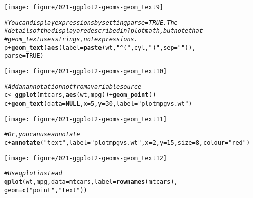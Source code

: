 \documentclass[a4paper,titlepage]{tufte-handout}\usepackage[]{graphicx}\usepackage[]{color}
\makeatletter
\def\maxwidth{ %
  \ifdim\Gin@nat@width>\linewidth
    \linewidth
  \else
    \Gin@nat@width
  \fi
}
\newcommand{\hlnum}[1]{\textcolor[rgb]{0.686,0.059,0.569}{#1}}%
\newcommand{\hlstr}[1]{\textcolor[rgb]{0.192,0.494,0.8}{#1}}%
\newcommand{\hlcom}[1]{\textcolor[rgb]{0.678,0.584,0.686}{\textit{#1}}}%
\newcommand{\hlopt}[1]{\textcolor[rgb]{0,0,0}{#1}}%
\newcommand{\hlstd}[1]{\textcolor[rgb]{0.345,0.345,0.345}{#1}}%
\newcommand{\hlkwa}[1]{\textcolor[rgb]{0.161,0.373,0.58}{\textbf{#1}}}%
\newcommand{\hlkwb}[1]{\textcolor[rgb]{0.69,0.353,0.396}{#1}}%
\newcommand{\hlkwc}[1]{\textcolor[rgb]{0.333,0.667,0.333}{#1}}%
\newcommand{\hlkwd}[1]{\textcolor[rgb]{0.737,0.353,0.396}{\textbf{#1}}}%
\newenvironment{kframe}{%
 \def\at@end@of@kframe{}%
 \ifinner\ifhmode%
  \def\at@end@of@kframe{\end{minipage}}%
  \begin{minipage}{\columnwidth}%
 \fi\fi%
 \def\FrameCommand##1{\hskip\@totalleftmargin \hskip-\fboxsep
 \colorbox{shadecolor}{##1}\hskip-\fboxsep
     \hskip-\linewidth \hskip-\@totalleftmargin \hskip\columnwidth}%
 \MakeFramed {\advance\hsize-\width
   \@totalleftmargin\z@ \linewidth\hsize
   \@setminipage}}%
 {\par\unskip\endMakeFramed%
 \at@end@of@kframe}
\newenvironment{knitrout}{}{} %
\makeatother
\begin{document}
\begin{knitrout}
\begin{kframe}
\begin{alltt}
\end{alltt}
\end{kframe}
\texttt{[image: figure/021-ggplot2-geoms-geom\_text9]} 
\begin{kframe}\begin{alltt}
\hlcom{# You can display expressions by setting parse = TRUE.  The}
\hlcom{# details of the display are described in ?plotmath, but note that}
\hlcom{# geom_text uses strings, not expressions.}
\hlstd{p} \hlopt{+} \hlkwd{geom_text}\hlstd{(}\hlkwd{aes}\hlstd{(}\hlkwc{label} \hlstd{=} \hlkwd{paste}\hlstd{(wt,} \hlstr{"^("}\hlstd{, cyl,} \hlstr{")"}\hlstd{,} \hlkwc{sep} \hlstd{=} \hlstr{""}\hlstd{)),}
  \hlkwc{parse} \hlstd{=} \hlnum{TRUE}\hlstd{)}
\end{alltt}
\end{kframe}
\texttt{[image: figure/021-ggplot2-geoms-geom\_text10]} 
\begin{kframe}\begin{alltt}
\hlcom{# Add an annotation not from a variable source}
\hlstd{c} \hlkwb{<-} \hlkwd{ggplot}\hlstd{(mtcars,} \hlkwd{aes}\hlstd{(wt, mpg))} \hlopt{+} \hlkwd{geom_point}\hlstd{()}
\hlstd{c} \hlopt{+} \hlkwd{geom_text}\hlstd{(}\hlkwc{data} \hlstd{=} \hlkwa{NULL}\hlstd{,} \hlkwc{x} \hlstd{=} \hlnum{5}\hlstd{,} \hlkwc{y} \hlstd{=} \hlnum{30}\hlstd{,} \hlkwc{label} \hlstd{=} \hlstr{"plot mpg vs. wt"}\hlstd{)}
\end{alltt}
\end{kframe}
\texttt{[image: figure/021-ggplot2-geoms-geom\_text11]} 
\begin{kframe}\begin{alltt}
\hlcom{# Or, you can use annotate}
\hlstd{c} \hlopt{+} \hlkwd{annotate}\hlstd{(}\hlstr{"text"}\hlstd{,} \hlkwc{label} \hlstd{=} \hlstr{"plot mpg vs. wt"}\hlstd{,} \hlkwc{x} \hlstd{=} \hlnum{2}\hlstd{,} \hlkwc{y} \hlstd{=} \hlnum{15}\hlstd{,} \hlkwc{size} \hlstd{=} \hlnum{8}\hlstd{,} \hlkwc{colour} \hlstd{=} \hlstr{"red"}\hlstd{)}
\end{alltt}
\end{kframe}
\texttt{[image: figure/021-ggplot2-geoms-geom\_text12]} 
\begin{kframe}\begin{alltt}
\hlcom{# Use qplot instead}
\hlkwd{qplot}\hlstd{(wt, mpg,} \hlkwc{data} \hlstd{= mtcars,} \hlkwc{label} \hlstd{=} \hlkwd{rownames}\hlstd{(mtcars),}
   \hlkwc{geom}\hlstd{=}\hlkwd{c}\hlstd{(}\hlstr{"point"}\hlstd{,} \hlstr{"text"}\hlstd{))}
\end{alltt}

\end{kframe}
\end{knitrout}
\end{document}
